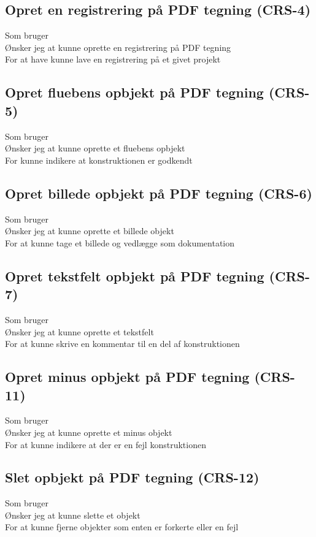 	\subsection*{Opret en registrering på PDF tegning (CRS-4)}
	Som bruger\\
	Ønsker jeg at kunne oprette en registrering på PDF tegning\\
	For at have kunne lave en registrering på et givet projekt 
	
	\subsection*{Opret fluebens opbjekt på PDF tegning (CRS-5)}
	Som bruger \\
	Ønsker jeg at kunne oprette et fluebens opbjekt\\
	For kunne indikere at konstruktionen er godkendt 

	\subsection*{Opret billede opbjekt på PDF tegning (CRS-6)}
	Som bruger\\
	Ønsker jeg at kunne oprette et billede objekt\\
	For at kunne tage et billede og vedlægge som dokumentation 
	
	\subsection*{Opret tekstfelt opbjekt på PDF tegning (CRS-7)}
	Som bruger\\
	Ønsker jeg at kunne oprette et tekstfelt\\
	For at kunne skrive en kommentar til en del af konstruktionen 
	
	\subsection*{Opret minus opbjekt på PDF tegning (CRS-11)}
	Som bruger\\
	Ønsker jeg at kunne oprette et minus objekt\\
	For at kunne indikere at der er en fejl konstruktionen

	\subsection*{Slet opbjekt på PDF tegning (CRS-12)}
	Som bruger\\
	Ønsker jeg at kunne slette et objekt\\
	For at kunne fjerne objekter som enten er forkerte eller en fejl 

